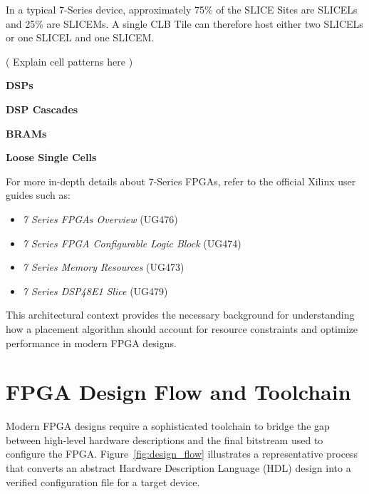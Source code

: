 \documentclass[twocolumn]{article}
\begin{document}
    In a typical 7-Series device, approximately 75\% of the SLICE Sites are SLICELs and 25\% are SLICEMs. 
    A single CLB Tile can therefore host either two SLICELs or one SLICEL and one SLICEM.

    ( Explain cell patterns here )


    \textbf{DSPs} \quad 

    \textbf{DSP Cascades} \quad 

    \textbf{BRAMs} \quad 

    \textbf{Loose Single Cells} \quad


    For more in-depth details about 7-Series FPGAs, refer to the official Xilinx user guides such as:
    \begin{itemize}
        \item \emph{7 Series FPGAs Overview} (UG476)
        \item \emph{7 Series FPGA Configurable Logic Block} (UG474)
        \item \emph{7 Series Memory Resources} (UG473)
        \item \emph{7 Series DSP48E1 Slice} (UG479)
    \end{itemize}

    This architectural context provides the necessary background for understanding how a placement algorithm should account for resource constraints and optimize performance in modern FPGA designs.


\section{FPGA Design Flow and Toolchain}
    \label{sec:fpga_flow_toolchain}

    Modern FPGA designs require a sophisticated toolchain to bridge the gap between high-level hardware descriptions and the final bitstream used to configure the FPGA. 
    Figure~\ref{fig:design_flow} illustrates a representative process that converts an abstract Hardware Description Language (HDL) design into a verified configuration file for a target device.
\end{document}
